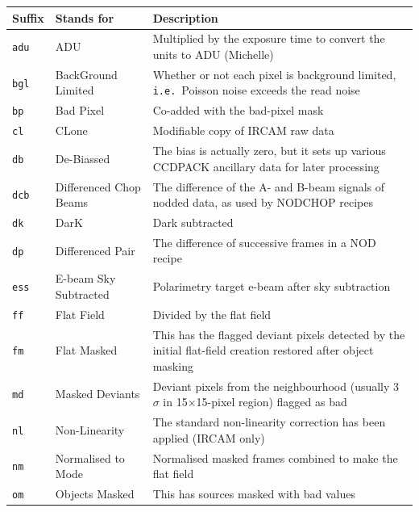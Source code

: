 \documentclass[twoside,11pt]{article}
\newcommand{\xref}[3]{#1}
\renewcommand{\_}{\texttt{\symbol{95}}}
\newcommand{\CCDPACK}{{\footnotesize CCDPACK}}
\begin{document}
\begin{tabular}{llp{90mm}}
\hline
  Suffix   & Stands for        & Description \\ \hline
{\tt\_adu} & ADU               & Multiplied by the exposure time to convert
                                 the units to ADU (Michelle) \\
{\tt\_bgl} & BackGround Limited & Whether or not each pixel is background
                                  limited, {\tt{i.e.}}\ Poisson noise exceeds
                                  the read noise \\
{\tt\_bp}  & Bad Pixel         & Co-added with the bad-pixel mask \\
{\tt\_cl}  & CLone             & Modifiable copy of IRCAM raw data \\
{\tt\_db}  & De-Biassed        & The bias is actually zero, but it sets
                                 up various \xref{\CCDPACK}{sun139}{}
                                 ancillary data for later processing \\
{\tt\_dcb} & Differenced Chop Beams & The difference of the A- and B-beam signals
                                      of nodded data, as used by NOD\_CHOP recipes \\
{\tt\_dk}  & DarK              & Dark subtracted \\
{\tt\_dp}  & Differenced Pair  & The difference of successive frames in a
                                 NOD recipe \\
{\tt\_ess} & E-beam Sky Subtracted & Polarimetry target e-beam after sky subtraction \\
{\tt\_ff}  & Flat Field        & Divided by the flat field \\
{\tt\_fm}  & Flat Masked       & This has the flagged deviant pixels
                                 detected by the initial flat-field creation
                                 restored after object masking \\
{\tt\_md}  & Masked Deviants   & Deviant pixels from the neighbourhood (usually
                                 3~$\sigma$ in 15$\times$15-pixel region) flagged as bad \\
{\tt\_nl}  & Non-Linearity     & The standard non-linearity correction has
                                 been applied (IRCAM only) \\
{\tt\_nm}  & Normalised to Mode & Normalised masked frames combined to make 
                                  the flat field \\
{\tt\_om } & Objects Masked    & This has sources masked with bad values

\end{tabular}
\end{document}
